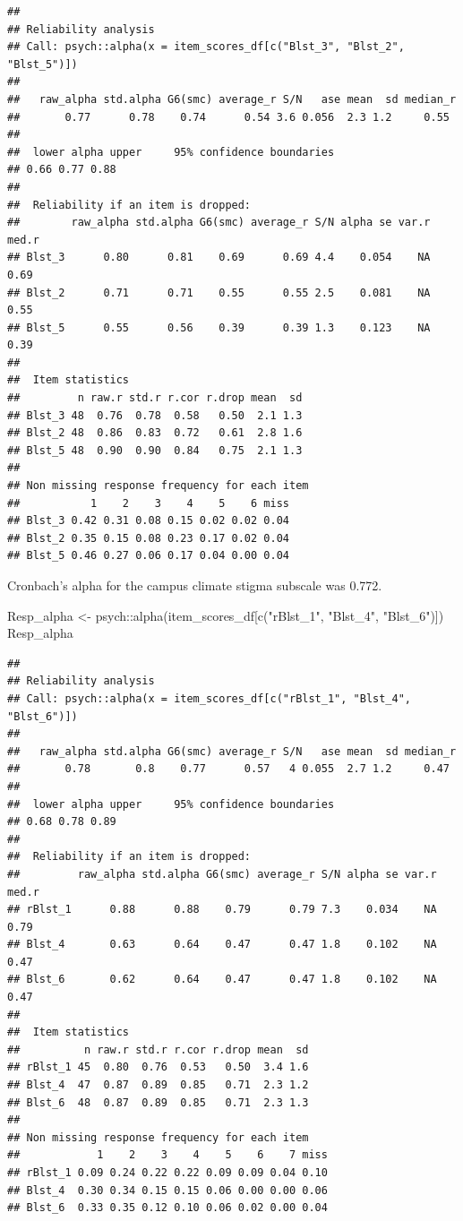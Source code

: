 \documentclass[
]{book}
\newenvironment{Shaded}{\begin{snugshade}}{\end{snugshade}}
\newcommand{\FunctionTok}[1]{\textcolor[rgb]{0.00,0.00,0.00}{#1}}
\newcommand{\NormalTok}[1]{#1}
\newcommand{\OtherTok}[1]{\textcolor[rgb]{0.56,0.35,0.01}{#1}}
\newcommand{\SpecialCharTok}[1]{\textcolor[rgb]{0.00,0.00,0.00}{#1}}
\newcommand{\StringTok}[1]{\textcolor[rgb]{0.31,0.60,0.02}{#1}}
\begin{document}
\begin{verbatim}
## 
## Reliability analysis   
## Call: psych::alpha(x = item_scores_df[c("Blst_3", "Blst_2", "Blst_5")])
## 
##   raw_alpha std.alpha G6(smc) average_r S/N   ase mean  sd median_r
##       0.77      0.78    0.74      0.54 3.6 0.056  2.3 1.2     0.55
## 
##  lower alpha upper     95% confidence boundaries
## 0.66 0.77 0.88 
## 
##  Reliability if an item is dropped:
##        raw_alpha std.alpha G6(smc) average_r S/N alpha se var.r med.r
## Blst_3      0.80      0.81    0.69      0.69 4.4    0.054    NA  0.69
## Blst_2      0.71      0.71    0.55      0.55 2.5    0.081    NA  0.55
## Blst_5      0.55      0.56    0.39      0.39 1.3    0.123    NA  0.39
## 
##  Item statistics 
##         n raw.r std.r r.cor r.drop mean  sd
## Blst_3 48  0.76  0.78  0.58   0.50  2.1 1.3
## Blst_2 48  0.86  0.83  0.72   0.61  2.8 1.6
## Blst_5 48  0.90  0.90  0.84   0.75  2.1 1.3
## 
## Non missing response frequency for each item
##           1    2    3    4    5    6 miss
## Blst_3 0.42 0.31 0.08 0.15 0.02 0.02 0.04
## Blst_2 0.35 0.15 0.08 0.23 0.17 0.02 0.04
## Blst_5 0.46 0.27 0.06 0.17 0.04 0.00 0.04
\end{verbatim}

Cronbach's alpha for the campus climate stigma subscale was 0.772.

\begin{Shaded}
\begin{Highlighting}[]
\NormalTok{Resp\_alpha }\OtherTok{\textless{}{-}}\NormalTok{ psych}\SpecialCharTok{::}\FunctionTok{alpha}\NormalTok{(item\_scores\_df[}\FunctionTok{c}\NormalTok{(}\StringTok{"rBlst\_1"}\NormalTok{, }\StringTok{"Blst\_4"}\NormalTok{, }\StringTok{"Blst\_6"}\NormalTok{)])}
\NormalTok{Resp\_alpha}
\end{Highlighting}
\end{Shaded}

\begin{verbatim}
## 
## Reliability analysis   
## Call: psych::alpha(x = item_scores_df[c("rBlst_1", "Blst_4", "Blst_6")])
## 
##   raw_alpha std.alpha G6(smc) average_r S/N   ase mean  sd median_r
##       0.78       0.8    0.77      0.57   4 0.055  2.7 1.2     0.47
## 
##  lower alpha upper     95% confidence boundaries
## 0.68 0.78 0.89 
## 
##  Reliability if an item is dropped:
##         raw_alpha std.alpha G6(smc) average_r S/N alpha se var.r med.r
## rBlst_1      0.88      0.88    0.79      0.79 7.3    0.034    NA  0.79
## Blst_4       0.63      0.64    0.47      0.47 1.8    0.102    NA  0.47
## Blst_6       0.62      0.64    0.47      0.47 1.8    0.102    NA  0.47
## 
##  Item statistics 
##          n raw.r std.r r.cor r.drop mean  sd
## rBlst_1 45  0.80  0.76  0.53   0.50  3.4 1.6
## Blst_4  47  0.87  0.89  0.85   0.71  2.3 1.2
## Blst_6  48  0.87  0.89  0.85   0.71  2.3 1.3
## 
## Non missing response frequency for each item
##            1    2    3    4    5    6    7 miss
## rBlst_1 0.09 0.24 0.22 0.22 0.09 0.09 0.04 0.10
## Blst_4  0.30 0.34 0.15 0.15 0.06 0.00 0.00 0.06
## Blst_6  0.33 0.35 0.12 0.10 0.06 0.02 0.00 0.04
\end{verbatim}
\end{document}
